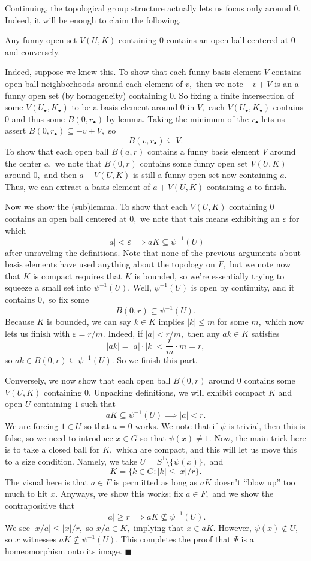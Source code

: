 Continuing, the topological group structure actually lets us focus only around $0.$ Indeed, it will be enough to claim the following.
\begin{lemma}
    Any funny open set $V(U,K)$ containing $0$ contains an open ball centered at $0$ and conversely.
\end{lemma}
Indeed, suppose we knew this. To show that each funny basis element $V$ contains open ball neighborhoods around each element of $v,$ then we note $-v+V$ is an a funny open set (by homogeneity) containing $0.$ So fixing a finite intersection of some $V(U_\bullet,K_\bullet)$ to be a basis element around $0$ in $V,$ each $V(U_\bullet,K_\bullet)$ contains $0$ and thus some $B(0,r_\bullet)$ by lemma. Taking the minimum of the $r_\bullet$ lets us assert $B(0,r_\bullet)\subseteq-v+V,$ so
\[B(v,r_\bullet)\subseteq V.\]
To show that each open ball $B(a,r)$ contains a funny basis element $V$ around the center $a,$ we note that $B(0,r)$ contains some funny open set $V(U,K)$ around $0,$ and then $a+V(U,K)$ is still a funny open set now containing $a.$ Thus, we can extract a basis element of $a+V(U,K)$ containing $a$ to finish.

Now we show the (sub)lemma. To show that each $V(U,K)$ containing $0$ contains an open ball centered at $0,$ we note that this means exhibiting an $\varepsilon$ for which
\[|a|<\varepsilon\implies aK\subseteq\psi^{-1}(U)\]
after unraveling the definitions. Note that none of the previous arguments about basis elements have used anything about the topology on $F,$ but we note now that $K$ is compact requires that $K$ is bounded, so we're essentially trying to squeeze a small set into $\psi^{-1}(U).$ Well, $\psi^{-1}(U)$ is open by continuity, and it contains $0,$ so fix some
\[B(0,r)\subseteq\psi^{-1}(U).\]
Because $K$ is bounded, we can say $k\in K$ implies $|k|\le m$ for some $m,$ which now lets us finish with $\varepsilon=r/m.$ Indeed, if $|a|<r/m,$ then any $ak\in K$ satisfies
\[|ak|=|a|\cdot|k|<\frac rm\cdot m=r,\]
so $ak\in B(0,r)\subseteq\psi^{-1}(U).$ So we finish this part.

Conversely, we now show that each open ball $B(0,r)$ around $0$ contains some $V(U,K)$ containing $0.$ Unpacking definitions, we will exhibit compact $K$ and open $U$ containing $1$ such that
\[aK\subseteq\psi^{-1}(U)\implies|a|<r.\]
We are forcing $1\in U$ so that $a=0$ works. We note that if $\psi$ is trivial, then this is false, so we need to introduce $x\in G$ so that $\psi(x)\ne1.$ Now, the main trick here is to take a closed ball for $K,$ which are compact, and this will let us move this to a size condition. Namely, we take $U=S^1\setminus\{\psi(x)\},$ and
\[K=\{k\in G:|k|\le|x|/r\}.\]
The visual here is that $a\in F$ is permitted as long as $aK$ doesn't ``blow up'' too much to hit $x.$ Anyways, we show this works; fix $a\in F,$ and we show the contrapositive that
\[|a|\ge r\implies aK\not\subseteq\psi^{-1}(U).\]
We see $|x/a|\le|x|/r,$ so $x/a\in K,$ implying that $x\in aK.$ However, $\psi(x)\notin U,$ so $x$ witnesses $aK\not\subseteq\psi^{-1}(U).$ This completes the proof that $\Psi$ is a homeomorphism onto its image. $\blacksquare$

